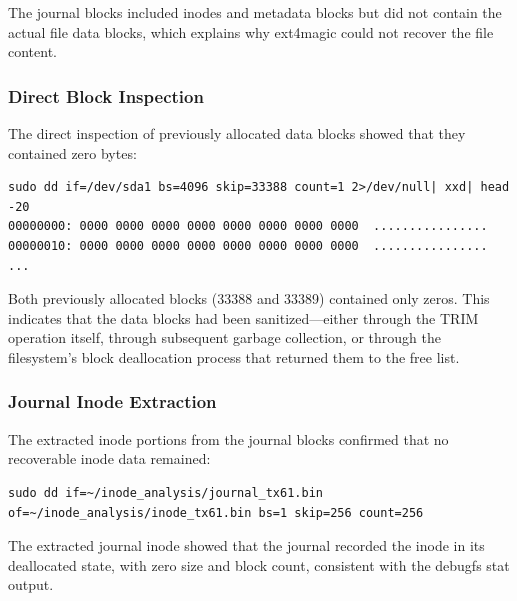 The journal blocks included inodes and metadata blocks but did not contain the actual file data blocks, which explains why ext4magic could not recover the file content.

\subsubsection*{Direct Block Inspection}

The direct inspection of previously allocated data blocks showed that they contained zero bytes:

\begin{verbatim}
sudo dd if=/dev/sda1 bs=4096 skip=33388 count=1 2>/dev/null| xxd| head -20
00000000: 0000 0000 0000 0000 0000 0000 0000 0000  ................
00000010: 0000 0000 0000 0000 0000 0000 0000 0000  ................
...
\end{verbatim}

Both previously allocated blocks (33388 and 33389) contained only zeros. This indicates that the data blocks had been sanitized—either through the TRIM operation itself, 
through subsequent garbage collection, or through the filesystem's block deallocation process that returned them to the free list.

\subsubsection*{Journal Inode Extraction}

The extracted inode portions from the journal blocks confirmed that no recoverable inode data remained:

\begin{verbatim}
sudo dd if=~/inode_analysis/journal_tx61.bin 
of=~/inode_analysis/inode_tx61.bin bs=1 skip=256 count=256
\end{verbatim}

The extracted journal inode showed that the journal recorded the inode in its deallocated state, with zero size and block count, consistent with the debugfs stat output.

